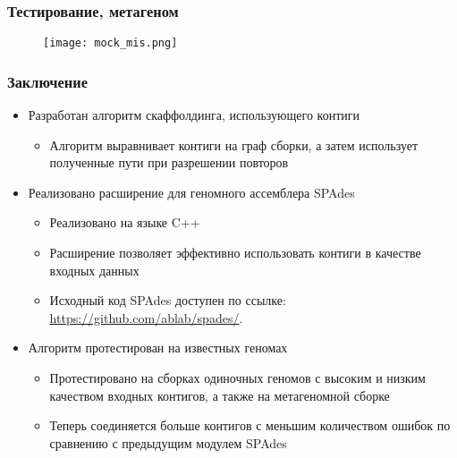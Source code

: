 \documentclass{beamer}
\begin{document}
\begin{frame}\frametitle{Тестирование, метагеном}
\begin{figure}
    \texttt{[image: mock\_mis.png]}
\end{figure}
\end{frame}


\begin{frame}\frametitle{Заключение}
\begin{itemize}
    \item Разработан алгоритм скаффолдинга, использующего
контиги
	\begin{itemize}
		\item Алгоритм выравнивает контиги на граф сборки, а затем использует полученные пути при разрешении повторов
	\end{itemize}
    \item Реализовано расширение для геномного ассемблера SPAdes
	\begin{itemize}
		\item Реализовано на языке C++
		\item Расширение позволяет эффективно использовать контиги в качестве входных данных
		\item \begin{sloppypar} Исходный код SPAdes доступен по ссылке: \mbox{\url{https://github.com/ablab/spades/}}.\end{sloppypar}
	\end{itemize}
    \item Алгоритм протестирован на известных геномах
	\begin{itemize}
		\item Протестировано на сборках одиночных геномов с высоким и низким качеством входных контигов, а также на метагеномной сборке
		\item Теперь соединяется больше контигов с меньшим количеством ошибок по сравнению с предыдущим модулем SPAdes
	\end{itemize}
\end{itemize}
\end{frame}

\end{document}
